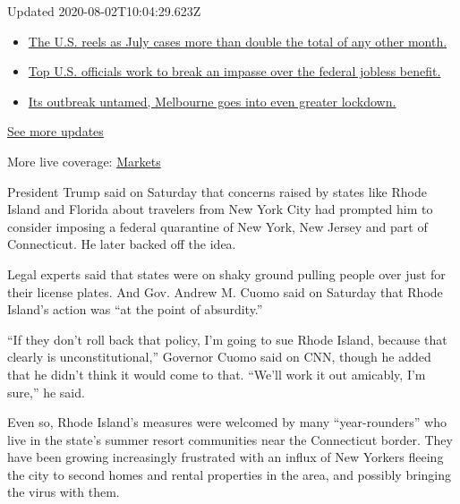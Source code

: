 Updated 2020-08-02T10:04:29.623Z

\begin{itemize}
\tightlist
\item
  \href{https://www.nytimes.com/2020/08/01/world/coronavirus-covid-19.html?action=click\&pgtype=Article\&state=default\&region=MAIN_CONTENT_1\&context=storylines_live_updates\#link-34047410}{The
  U.S. reels as July cases more than double the total of any other
  month.}
\item
  \href{https://www.nytimes.com/2020/08/01/world/coronavirus-covid-19.html?action=click\&pgtype=Article\&state=default\&region=MAIN_CONTENT_1\&context=storylines_live_updates\#link-780ec966}{Top
  U.S. officials work to break an impasse over the federal jobless
  benefit.}
\item
  \href{https://www.nytimes.com/2020/08/01/world/coronavirus-covid-19.html?action=click\&pgtype=Article\&state=default\&region=MAIN_CONTENT_1\&context=storylines_live_updates\#link-2bc8948}{Its
  outbreak untamed, Melbourne goes into even greater lockdown.}
\end{itemize}

\href{https://www.nytimes.com/2020/08/01/world/coronavirus-covid-19.html?action=click\&pgtype=Article\&state=default\&region=MAIN_CONTENT_1\&context=storylines_live_updates}{See
more updates}

More live coverage:
\href{https://www.nytimes.com/live/2020/07/31/business/stock-market-today-coronavirus?action=click\&pgtype=Article\&state=default\&region=MAIN_CONTENT_1\&context=storylines_live_updates}{Markets}

President Trump said on Saturday that concerns raised by states like
Rhode Island and Florida about travelers from New York City had prompted
him to consider imposing a federal quarantine of New York, New Jersey
and part of Connecticut. He later backed off the idea.

Legal experts said that states were on shaky ground pulling people over
just for their license plates. And Gov. Andrew M. Cuomo said on Saturday
that Rhode Island's action was ``at the point of absurdity.''

``If they don't roll back that policy, I'm going to sue Rhode Island,
because that clearly is unconstitutional,'' Governor Cuomo said on CNN,
though he added that he didn't think it would come to that. ``We'll work
it out amicably, I'm sure,'' he said.

Even so, Rhode Island's measures were welcomed by many ``year-rounders''
who live in the state's summer resort communities near the Connecticut
border. They have been growing increasingly frustrated with an influx of
New Yorkers fleeing the city to second homes and rental properties in
the area, and possibly bringing the virus with them.

